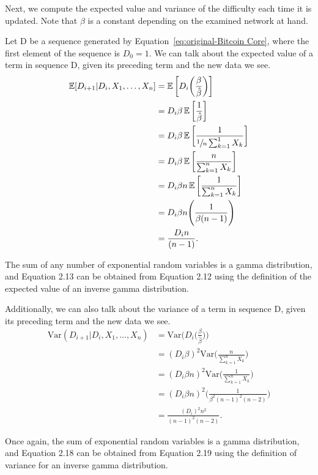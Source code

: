Next, we compute the expected value and variance of the difficulty each time it is updated. Note that $\beta$ is a constant depending on the examined network at hand.

 Let D be a sequence generated by Equation~\ref{eq:original-Bitcoin Core}, where the first element of the sequence is $D_0 = 1$. We can talk about the expected value of a term in sequence D, given its preceding term and the new data we see. 
\begin{align}
\operatorname{\mathbb{E}}[D_{i+1} | D_{i}, X_1, \dots, X_{n}] &= \operatorname{\mathbb{E}}\bigg[D_i \bigg(\frac{\beta}{\hat{\beta}}\bigg)\bigg] \\
&= D_i \beta \operatorname{\mathbb{E}}\bigg[\frac{1}{\hat{\beta}}\bigg] \\
&= D_i \beta \operatorname{\mathbb{E}}\bigg[\frac{1}{\sfrac{1}{n}\sum_{k=1}^{1} X_k}\bigg] \\
&= D_i \beta \operatorname{\mathbb{E}}\bigg[\frac{n}{\sum_{k=1}^{n} X_k}\bigg] \\
&= D_i \beta n \operatorname{\mathbb{E}}\bigg[\frac{1}{\sum_{k=1}^{n} X_k}\bigg] \\
&= D_i \beta n \Bigg(\frac{1}{\beta(n-1)}\Bigg) \\
&= \frac{D_i n}{(n-1)}.
\end{align}

The sum of any number of exponential random variables is a gamma distribution, and Equation 2.13 can be obtained from Equation 2.12 using the definition of the expected value of an inverse gamma distribution.

Additionally, we can also talk about the variance of a term in sequence D, given its preceding term and the new data we see. 
\begin{align}
\text{Var}(D_{i+1} | D_{i}, X_1, \dots, X_{n}) &= \text{Var}\bigg(D_i \bigg(\frac{\beta}{\hat{\beta}}\bigg)\bigg) \\
&= (D_i \beta)^2 \text{Var}\bigg(\frac{n}{\sum_{k=1}^{n} X_k}\bigg) \\ 
&= (D_i \beta n)^2 \text{Var}\bigg(\frac{1}{\sum_{k=1}^{n} X_k}\bigg) \\ 
&= (D_i \beta n)^2 \Bigg(\frac{1}{\beta^2(n-1)^2(n-2)}\Bigg) \\
&= \frac{(D_i)^2 n^2}{(n-1)^2(n-2)}.
\end{align}

Once again, the sum of exponential random variables is a gamma distribution, and Equation 2.18 can be obtained from Equation 2.19 using the definition of variance for an inverse gamma distribution.

